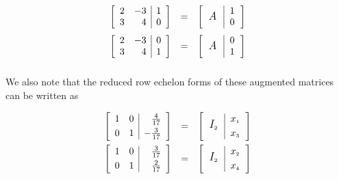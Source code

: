 \documentclass{ximera}
\begin{document}
\[ \begin{array}{rcl}

\left[ \begin{array}{rr|r} 2 & -3 & 1 \\ 3 & 4 & 0 \\ \end{array} \right] & = & \left[ \begin{tabular}{c|r}
\multirow{2}{10pt}{\large \textit{A}} & 1 \\ & 0 \end{tabular} \right] \\ [13pt]

\left[ \begin{array}{rr|r} 2 & -3 & 0 \\ 3 & 4 & 1 \\ \end{array} \right] & = & \left[ \begin{tabular}{c|r} \multirow{2}{10pt}{\large \textit{A}} & 0 \\ & 1 \end{tabular} \right] \\ [13pt]

\end{array} \]

We also note that the reduced row echelon forms of these augmented matrices can be written as

\[ \begin{array}{rcl}

\left[ \begin{array}{rr|r} 1 & 0 & \frac{4}{17} \\[3pt] 0 & 1 & -\frac{3}{17} \\ \end{array} \right] & = & \left[ \begin{tabular}{c|r} \multirow{2}{10pt}{\large $I_{\mbox{\tiny$2$}}$} & $x_{\mbox{\tiny$1$}}$ \\[3pt] &  $x_{\mbox{\tiny$3$}}$ \end{tabular} \right]\\ [13pt]

\left[ \begin{array}{rr|r} 1 & 0 & \hphantom{-}\frac{3}{17} \\[3pt] 0 & 1 & \frac{2}{17} \\ \end{array} \right] & = & \left[ \begin{tabular}{c|r} \multirow{2}{10pt}{\large $I_{\mbox{\tiny$2$}}$} & $x_{\mbox{\tiny$2$}}$ \\[3pt] & $x_{\mbox{\tiny$4$}}$ \end{tabular} \right]

\end{array} \]
\end{document}
